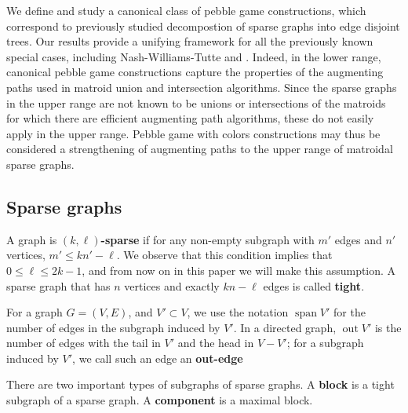 \documentclass[11pt]{article}
\newcommand{\labeleq}[1]{\label{eq.#1}}
\newcommand{\grsp}{\ensuremath{\operatorname{span}}}
\newcommand{\out}{\ensuremath{\operatorname{out}}}
\begin{document}
		We define and study a canonical class of pebble game constructions, 
		which correspond to previously studied decompostion of sparse graphs 
		into edge disjoint trees.  
		Our results provide a unifying framework for all the previously known special cases, 
		including Nash-Williams-Tutte and \cite{whiteley:union-matroids,haas:2002}.
		Indeed, in the lower range,
		canonical pebble game constructions capture the properties of the augmenting paths 
		used in matroid union and intersection algorithms\cite{gabow1995,GaWe88}.  Since the sparse
		graphs in the upper range are not known to be unions or intersections of the matroids 
		for which there are efficient augmenting path algorithms, these do not easily apply in
		the upper range.  Pebble game with colors constructions may thus be considered 
		a strengthening of augmenting paths to the upper range of matroidal sparse graphs.



\subsection{Sparse graphs}
	A graph is {\bf $(k,\ell)$-sparse} if for any non-empty subgraph with $m'$
	edges and $n'$ vertices,
	\(
		m' \le kn'-\ell. %
	\)
We observe that this condition implies that $0\le \ell\le 2k-1$, and from now
on in this paper we will make this assumption.  A sparse graph that has $n$ vertices and exactly $kn-\ell$ edges is called {\bf tight}.
	
For a graph $G=(V,E)$, and $V'\subset V$, we use the notation $\grsp V'$ for the number of edges in the subgraph induced by $V'$.  In a directed graph, $\out V'$ is the number of edges with the tail 
in $V'$ and the head in $V-V'$; for a subgraph induced by $V'$, we call such an edge an 
{\bf out-edge}

There are two important types of subgraphs of sparse graphs. 
A {\bf block} is a tight subgraph of a sparse graph. A {\bf component} is a maximal block.  
\end{document}
